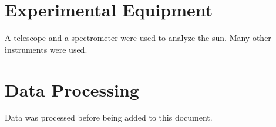 
\begin{theappendices}
    \chapter{Experimental Equipment}
    \thispagestyle{myheadings}
    A telescope and a spectrometer were used to analyze the sun. Many other instruments were used.
    
    \chapter{Data Processing}
    \thispagestyle{myheadings}
    Data was processed before being added to this document.
    
\end{theappendices}